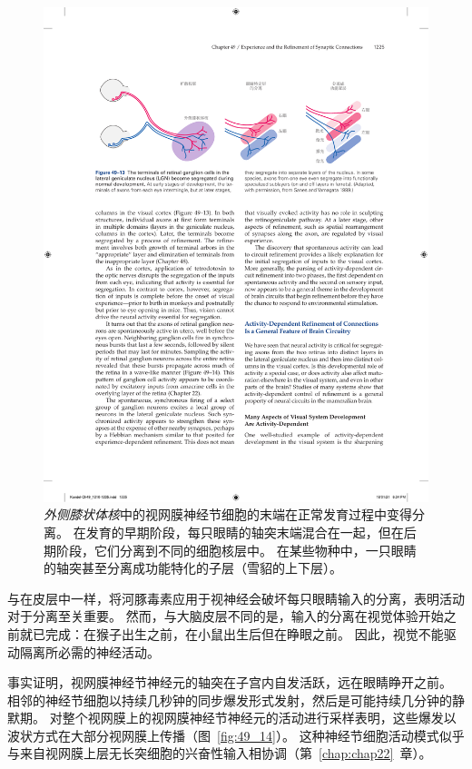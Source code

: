 \begin{figure}[htbp]
	\centering
	\includegraphics[width=1.0\linewidth]{chap49/fig_49_13}
	\caption{\textit{外侧膝状体核}中的视网膜神经节细胞的末端在正常发育过程中变得分离。
		在发育的早期阶段，每只眼睛的轴突末端混合在一起，但在后期阶段，它们分离到不同的细胞核层中。
		在某些物种中，一只眼睛的轴突甚至分离成功能特化的子层（雪貂的上下层）\cite{sanes1999formation}。}
	\label{fig:49_13}
\end{figure}


与在皮层中一样，将河豚毒素应用于视神经会破坏每只眼睛输入的分离，表明活动对于分离至关重要。
然而，与大脑皮层不同的是，输入的分离在视觉体验开始之前就已完成：在猴子出生之前，在小鼠出生后但在睁眼之前。
因此，视觉不能驱动隔离所必需的神经活动。


事实证明，视网膜神经节神经元的轴突在子宫内自发活跃，远在眼睛睁开之前。
相邻的神经节细胞以持续几秒钟的同步爆发形式发射，然后是可能持续几分钟的静默期。
对整个视网膜上的视网膜神经节神经元的活动进行采样表明，这些爆发以波状方式在大部分视网膜上传播（图~\ref{fig:49_14}）。
这种神经节细胞活动模式似乎与来自视网膜上层无长突细胞的兴奋性输入相协调（第~\ref{chap:chap22}~章）。


